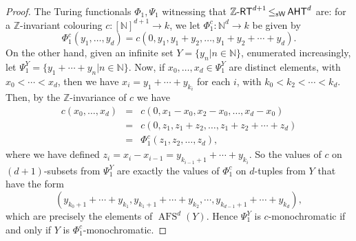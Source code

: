 \documentclass[10pt,a4paper]{amsart}
\DeclareMathOperator{\afs}{AFS}
\newcommand{\aht}{\mathnormal{\mathsf{AHT}}}
\newcommand{\weisleq}{\mathop{\leq_{\mathrm{s}\mathsf{W}}}}
\newcommand{\zrt}{\mathnormal{\mathbb Z\text{-}\mathsf{RT}}}
\begin{document}
\begin{proof}
The Turing functionals $\Phi_1,\Psi_1$ witnessing that $\zrt^{d+1}\weisleq\aht^d$ are: for a $\mathbb Z$-invariant colouring $c:[\mathbb N]^{d+1}\longrightarrow k$, we let $\Phi_1^c:\mathbb N^d\longrightarrow k$ be given by
\begin{equation*}
\Phi_1^c(y_1,\ldots,y_d)=c(0,y_1,y_1+y_2,\ldots,y_1+y_2+\cdots+y_d).
\end{equation*}
On the other hand, given an infinite set $Y=\{y_n\big|n\in\mathbb N\}$, enumerated increasingly, let $\Psi_1^Y=\{y_1+\cdots+y_n\big|n\in\mathbb N\}$. %
Now, if $x_0,\ldots,x_d\in\Psi_1^Y$ are distinct elements, with $x_0<\cdots<x_d$, then we have 
$x_i=y_1+\cdots+y_{k_i}$ for each $i$, with
$k_0<k_2<\cdots<k_d$. Then, by the $\mathbb Z$-invariance of $c$ we have
\begin{eqnarray*}
c(x_0,\ldots,x_d) & = & c(0,x_1-x_0,x_2-x_0,\ldots,x_d-x_0) \\
 & = & c(0,z_1,z_1+z_2,\ldots,z_1+z_2+\cdots+z_d) \\
 & = & \Phi_1^c(z_1,z_2,\ldots,z_d),
\end{eqnarray*}
where we have defined $z_i=x_i-x_{i-1}=y_{k_{i-1}+1}+\cdots+y_{k_i}$. So the values of $c$ on $(d+1)$-subsets from $\Psi_1^Y$ are exactly the values of $\Phi_1^c$ on $d$-tuples from $Y$ that have the form
\begin{equation*}
(y_{k_0+1}+\cdots+y_{k_1},y_{k_1+1}+\cdots+y_{k_2},\cdots,y_{k_{d-1}+1}+\cdots+y_{k_d}),
\end{equation*}
which are precisely the elements of $\afs^d(Y)$. Hence $\Psi_1^Y$ is $c$-monochromatic if and only if $Y$ is $\Phi_1^c$-monochromatic.


\end{proof}
\end{document}
